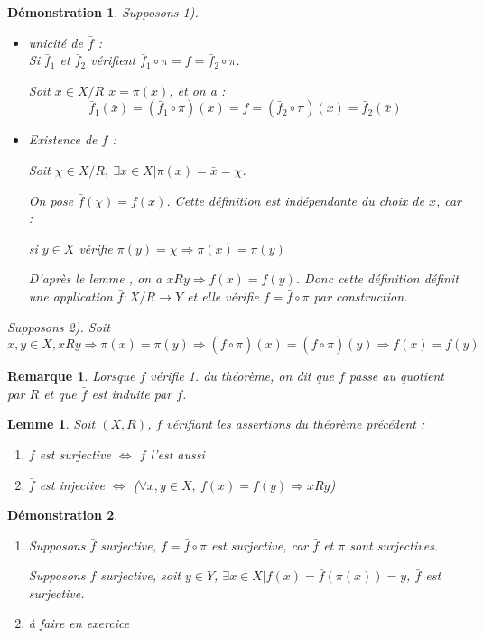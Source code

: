 \documentclass[a4paper, oneside]{report}
\theoremstyle{break}
\newtheorem{lemme}[thm]{Lemme}
\newtheorem{remar}[thm]{Remarque}
\newtheorem*{demo}{Démonstration}
\begin{document}
\begin{demo}
	Supposons 1).
	
	\begin{itemize}
		\item unicité de $\bar{f}$ :\\
		Si $\bar{f}_1$ et $\bar{f}_2$ vérifient $\bar{f}_1\circ \pi = f = \bar{f}_2 \circ \pi$.
		
		Soit $\bar{x}\in X/R$ $\bar{x}=\pi(x)$, et on a :
		$$\bar{f}_1(\bar{x})=(\bar{f}_1\circ \pi)(x)=f=(\bar{f}_2\circ \pi)(x)=\bar{f}_2(\bar{x})$$
		
		\item Existence de $\bar{f}$ :
		
		Soit $\chi\in X/R,~\exists x\in X | \pi(x)=\bar{x}=\chi$.
		
		On pose $\bar{f}(\chi)=f(x)$. Cette définition est indépendante du choix de $x$, car :
		
		si $y\in X$ vérifie $\pi(y)=\chi\Rightarrow \pi(x)=\pi(y)$
		
		D'après le lemme , on a $xRy \Rightarrow f(x)=f(y)$. Donc cette définition définit une application $\bar{f}:X/R \rightarrow Y$ et elle vérifie $f=\bar{f}\circ \pi$ par construction.
	\end{itemize}
	Supposons 2). Soit $x,y\in X, xRy \Rightarrow \pi(x)=\pi(y)\Rightarrow (\bar{f}\circ \pi)(x)=(\bar{f}\circ \pi)(y)\Rightarrow f(x)=f(y)$
\end{demo}

\begin{remar}
	Lorsque $f$ vérifie 1. du théorème, on dit que $f$ passe au quotient par $R$ et que $\bar{f}$ est induite par $f$.
\end{remar}

\begin{lemme}
	Soit $(X,R)$, $f$ vérifiant les assertions du théorème précédent :
	\begin{enumerate}
		\item $\bar{f}$ est surjective $\Leftrightarrow$ $f$ l'est aussi
		\item $\bar{f}$ est injective $\Leftrightarrow$ ($\forall x,y\in X,~f(x)=f(y)\Rightarrow xRy$)
	\end{enumerate}
\end{lemme}

\begin{demo}
	\begin{enumerate}
		
		\item Supposons $\bar{f}$ surjective, $f=\bar{f}\circ \pi$ est surjective, car $\bar{f}$ et $\pi$ sont surjectives.
		
		Supposons $f$ surjective, soit $y\in Y$, $\exists x \in X | f(x)=\bar{f}(\pi(x))=y$, $\bar{f}$ est surjective.
		\item à faire en exercice
	\end{enumerate}
\end{demo}
\end{document}

